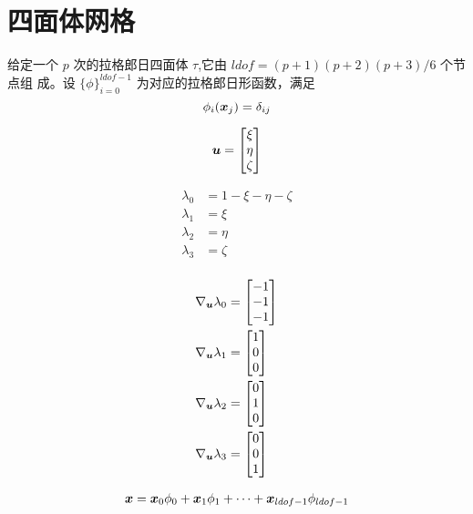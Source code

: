 \documentclass{article}
\begin{document}
\section{四面体网格}
给定一个 $p$ 次的拉格郎日四面体 $\tau$,它由 $ldof = (p+1)(p+2)(p+3)/6$ 个节点组
成。设 $\{\phi\}_{i=0}^{ldof-1}$ 为对应的拉格郎日形函数，满足
$$
\phi_i({\boldsymbol x}_j) = \delta_{ij}
$$

\begin{align*}
    {\boldsymbol u} = 
    \begin{bmatrix}
        \xi \\ \eta \\ \zeta
    \end{bmatrix}
\end{align*}

\begin{align*}
    \lambda_0 &= 1-\xi-\eta-\zeta \\
    \lambda_1 &= \xi \\
    \lambda_2 &= \eta \\
    \lambda_3 &= \zeta \\
\end{align*}

\begin{align*}
    \nabla_{\boldsymbol u}\lambda_0  & = 
    \begin{bmatrix}
        -1 \\ -1 \\ -1
    \end{bmatrix}\\
    \nabla_{\boldsymbol u}\lambda_1 & = 
    \begin{bmatrix}
        1 \\ 0 \\0
    \end{bmatrix}\\
    \nabla_{\boldsymbol u}\lambda_2 & = 
    \begin{bmatrix}
        0 \\ 1 \\ 0
    \end{bmatrix}\\
    \nabla_{\boldsymbol u}\lambda_3 & = 
    \begin{bmatrix}
        0 \\ 0 \\ 1
    \end{bmatrix}
\end{align*}

\begin{align*}
    {\boldsymbol x} = {\boldsymbol x}_0\phi_0 +{\boldsymbol x}_1\phi_1+\cdots+{\boldsymbol x}_{ldof-1}\phi_{ldof-1}
\end{align*}
\end{document}
